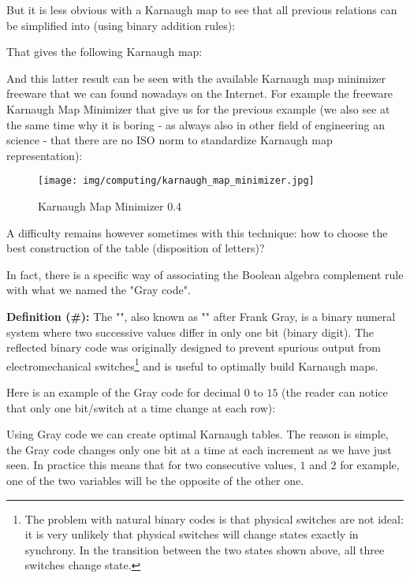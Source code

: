 	But it is less obvious with a Karnaugh map to see that all previous relations can be simplified into (using binary addition rules):
	
	That gives the following Karnaugh map:
	\begin{center}
	
	\end{center}
	And this latter result can be seen with the available Karnaugh map minimizer freeware that we can found nowadays on the Internet. For example the freeware Karnaugh Map Minimizer that give us for the previous example (we also see at the same time why it is boring - as always also in other field of engineering an science - that there are no ISO norm to standardize Karnaugh map representation):
	\begin{figure}[H]
		\centering
		\texttt{[image: img/computing/karnaugh\_map\_minimizer.jpg]}
		\caption{Karnaugh Map Minimizer 0.4}
	\end{figure}
	A difficulty remains however sometimes with this technique: how to choose the best construction of the table (disposition of letters)?

	In fact, there is a specific way of associating the Boolean algebra complement rule with what we named the "Gray code".

	\textbf{Definition (\#\mydef):} The "", also known as "" after Frank Gray, is a binary numeral system where two successive values differ in only one bit (binary digit). The reflected binary code was originally designed to prevent spurious output from electromechanical switches\footnote{The problem with natural binary codes is that physical switches are not ideal: it is very unlikely that physical switches will change states exactly in synchrony. In the transition between the two states shown above, all three switches change state.} and is useful to optimally build Karnaugh maps.

	Here is an example of the Gray code for decimal $0$ to $15$ (the reader can notice that only one bit/switch at a time change at each row):
	
	Using Gray code we can create optimal Karnaugh tables. The reason is simple, the Gray code changes only one bit at a time at each increment as we have just seen. In practice this means that for two consecutive values, $1$ and $2$ for example, one of the two variables will be the opposite of the other one.
	
